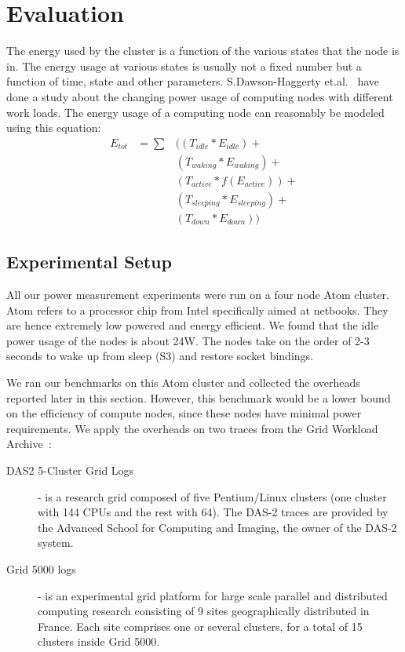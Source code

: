 \section{Evaluation} %
\label{sec:results}
The energy used by the cluster is a function of the various states that the node is in. The energy usage at various states is usually not a fixed number but a function of time, state and other parameters. S.Dawson-Haggerty et.al.~\cite{Dawson-Haggerty:09} have done a study about the changing power usage of computing nodes with different work loads. The energy usage of a computing node can reasonably be modeled using this equation:
\begin{eqnarray}
    E_{tot}  &= \sum &\big((T_{idle} * E_{idle}) + \nonumber \\
             &       &(T_{waking} * E_{waking}) + \nonumber \\
             &       &(T_{active} * f(E_{active})) + \nonumber \\
             &       &(T_{sleeping} * E_{sleeping}) + \nonumber \\
             &       &(T_{down} * E_{down}) \big)
\end{eqnarray}

\subsection{Experimental Setup} %
\label{sub:experimental_setup}
All our power measurement experiments were run on a four node Atom cluster. Atom refers to a processor chip from Intel specifically aimed at netbooks. They are hence extremely low powered and energy efficient. We found that the idle power usage of the nodes is about 24W. The nodes take on the order of 2-3 seconds to wake up from sleep (S3) and restore socket bindings. 

We ran our benchmarks on this Atom cluster and collected the overheads reported later in this section. However, this benchmark would be a lower bound on the efficiency of compute nodes, since these nodes have minimal power requirements. We apply the overheads on two traces from the Grid Workload Archive~\cite{gwa}:
\begin{description}
    \item[DAS2 5-Cluster Grid Logs] - is a research grid composed of five Pentium/Linux clusters (one cluster with 144 CPUs and the rest with 64). The DAS-2 traces are provided by the Advanced School for Computing and Imaging, the owner of the DAS-2 system.
    \item[Grid 5000 logs] - is an experimental grid platform for large scale parallel and distributed computing research consisting of 9 sites geographically distributed in France. Each site comprises one or  several clusters, for a total of 15 clusters inside Grid 5000.
\end{description}


